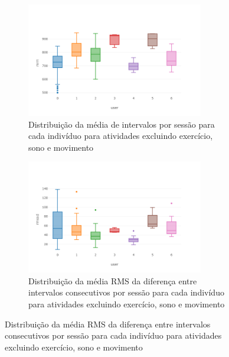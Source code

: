             
            
            \begin{figure}
            \begin{subfigure}
                \centering
                \includegraphics[width=0.85\textwidth]{sessions/sess_box_mrri_all.png}
                \caption{Distribuição da média de intervalos por sessão para cada indivíduo para atividades excluindo exercício, sono e movimento}
                \label{sess_box_mrri_all}
            \end{subfigure} 
            \begin{subfigure}
                \centering
                \includegraphics[width=0.85\textwidth]{sessions/sess_box_rmssd_all.png}
                \caption{Distribuição da média RMS da diferença entre  intervalos consecutivos por sessão para cada indivíduo para atividades excluindo exercício, sono e movimento}
                \label{sess_box_rmssd_all}
            \end{subfigure} 
            \end{figure}

            
            
